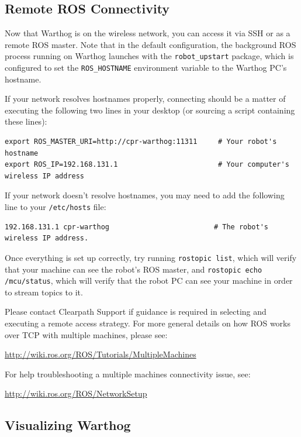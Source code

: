 \documentclass[]{clearpath-latex/clearpath-manual}
\begin{document}
\pagebreak[4]
\subsection{Remote ROS Connectivity}

Now that Warthog is on the wireless network, you can access it via SSH or as a remote ROS master. Note that in the default configuration, the background ROS process running on Warthog launches with the \lstinline{robot_upstart} package, which is configured to set the \lstinline{ROS_HOSTNAME} environment variable to the Warthog PC's hostname.

If your network resolves hostnames properly, connecting should be a matter of executing the following two lines in your desktop (or sourcing a script containing these lines):

\begin{lstlisting}
export ROS_MASTER_URI=http://cpr-warthog:11311     # Your robot's hostname
export ROS_IP=192.168.131.1                        # Your computer's wireless IP address
\end{lstlisting}

If your network doesn't resolve hostnames, you may need to add the following line to your \lstinline{/etc/hosts} file:

\begin{lstlisting}
192.168.131.1 cpr-warthog                         # The robot's wireless IP address.
\end{lstlisting}

Once everything is set up correctly, try running \lstinline{rostopic list}, which will verify that your machine can see the robot's ROS master, and \lstinline{rostopic echo /mcu/status}, which will verify that the robot PC can see your machine in order to stream topics to it.

Please contact Clearpath Support if guidance is required in selecting and executing a remote access strategy.
For more general details on how ROS works over TCP with multiple machines, please see:

\url{http://wiki.ros.org/ROS/Tutorials/MultipleMachines}

For help troubleshooting a multiple machines connectivity issue, see:

\url{http://wiki.ros.org/ROS/NetworkSetup}

\subsection{Visualizing Warthog}
\end{document}
